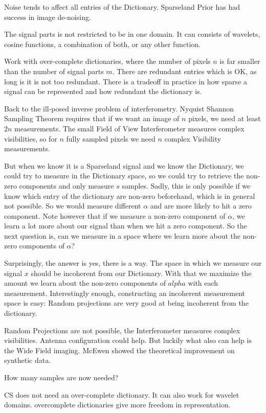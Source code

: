 Noise tends to affect all entries of the Dictionary. Sparseland Prior has had success in image de-noising.

The signal parts is not restricted to be in one domain. It can consists of wavelets, cosine functions, a combination of both, or any other function. 

Work with over-complete dictionaries, where the number of pixels $n$ is far smaller than the number of signal parts $m$. There are redundant entries which is OK, as long is it is not too redundant. There is a tradeoff in practice in how sparse a signal can be represented and how redundant the dictionary is.

Back to the ill-posed inverse problem of interferometry. Nyquist Shannon Sampling Theorem requires that if we want an image of $n$ pixels, we need at least $2n$ measurements. The small Field of View Interferometer measures complex visibilities, so for $n$ fully sampled pixels we need $n$ complex Visibility measurements.

But when we know it is a Sparseland signal and we know the Dictionary, we could try to measure in the Dictionary space, so we could try to retrieve the non-zero components and only measure $s$ samples. Sadly, this is only possible if we know which entry of the dictionary are non-zero beforehand, which is in general not possible. So we would measure different $\alpha$ and are more likely to hit a zero component. Note however that if we measure a non-zero component of $\alpha$, we learn a lot more about our signal than when we hit a zero component. So the next question is, can we measure in a space where we learn more about the non-zero components of $\alpha$?

Surprisingly, the answer is yes, there is a way. The space in which we measure our signal $x$ should be incoherent from our Dictionary. With that we maximize the amount we learn about the non-zero components of $alpha$ with each measurement. Interestingly enough, constructing an incoherent measurement space is easy: Random projections are very good at being incoherent from the dictionary. 

Random Projections are not possible, the Interferometer measures complex visibilities. Antenna configuration could help. But luckily what also can help is the Wide Field imaging. McEwen \cite{mcewen2011compressed} showed the theoretical improvement on synthetic data.

How many samples are now needed? 

CS does not need an over-complete dictionary. It can also work for wavelet domains. overcomplete dictionaries give more freedom in representation.

